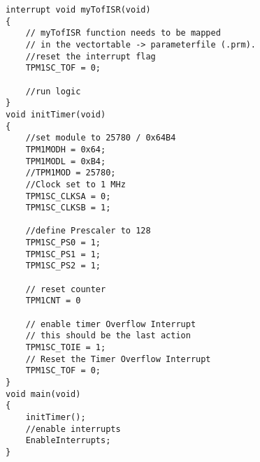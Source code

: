 \begin{lstlisting}
interrupt void myTofISR(void)
{
    // myTofISR function needs to be mapped
    // in the vectortable -> parameterfile (.prm).
    //reset the interrupt flag
    TPM1SC_TOF = 0;

    //run logic
}
void initTimer(void)
{
    //set module to 25780 / 0x64B4
    TPM1MODH = 0x64;
    TPM1MODL = 0xB4;
    //TPM1MOD = 25780;
    //Clock set to 1 MHz
    TPM1SC_CLKSA = 0;
    TPM1SC_CLKSB = 1;

    //define Prescaler to 128
    TPM1SC_PS0 = 1;
    TPM1SC_PS1 = 1;
    TPM1SC_PS2 = 1;

    // reset counter
    TPM1CNT = 0

    // enable timer Overflow Interrupt
    // this should be the last action
    TPM1SC_TOIE = 1;
    // Reset the Timer Overflow Interrupt
    TPM1SC_TOF = 0;
}
void main(void)
{
    initTimer();
    //enable interrupts
    EnableInterrupts;
}
\end{lstlisting}
